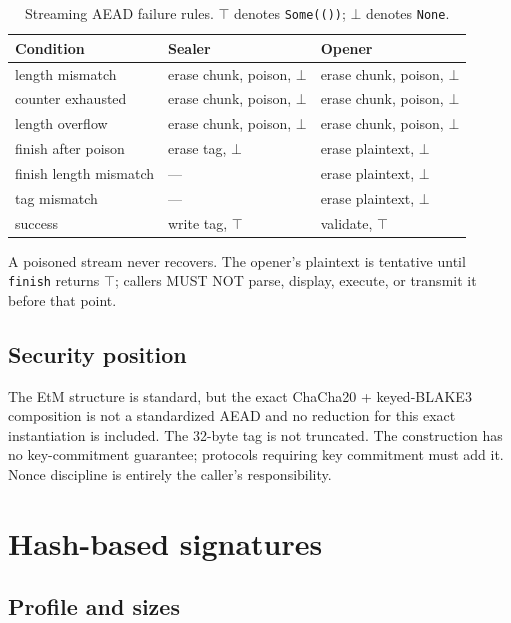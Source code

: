 \documentclass[runningheads]{llncs}
\begin{document}
\begin{table}[t]
\centering
\small
\begin{tabular}{@{}lll@{}}
\toprule
Condition & Sealer & Opener \\
\midrule
length mismatch & erase chunk, poison, $\bot$ & erase chunk, poison, $\bot$ \\
counter exhausted & erase chunk, poison, $\bot$ & erase chunk, poison, $\bot$ \\
length overflow & erase chunk, poison, $\bot$ & erase chunk, poison, $\bot$ \\
finish after poison & erase tag, $\bot$ & erase plaintext, $\bot$ \\
finish length mismatch & --- & erase plaintext, $\bot$ \\
tag mismatch & --- & erase plaintext, $\bot$ \\
success & write tag, $\top$ & validate, $\top$ \\
\bottomrule
\end{tabular}
\caption{Streaming AEAD failure rules.  $\top$ denotes
\texttt{Some(())}; $\bot$ denotes \texttt{None}.}
\label{tab:aeadfail}
\end{table}

A poisoned stream never recovers.  The opener's plaintext is tentative
until \texttt{finish} returns $\top$; callers MUST NOT parse, display,
execute, or transmit it before that point.

\subsection{Security position}

The EtM structure is standard, but the exact ChaCha20 + keyed-BLAKE3
composition is not a standardized AEAD and no reduction for this exact
instantiation is included.  The 32-byte tag is not truncated.  The
construction has no key-commitment guarantee; protocols requiring key
commitment must add it.  Nonce discipline is entirely the caller's
responsibility.

\section{Hash-based signatures}
\label{sec:ds}

\subsection{Profile and sizes}
\end{document}
